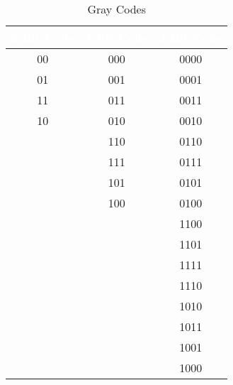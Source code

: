 \begin{table}[H]
  \sffamily
  \newcommand{\head}[1]{\textcolor{white}{\textbf{#1}}}    
  \begin{center}
    \begin{tabular}{ c c c } 
      \hline
      \rowcolor{black!75}
      {\head{2-Bit Code}} & {\head{3-Bit Code}} & \head{4-Bit Code} \\ 
      \hline    
      00  & 000 & 0000 \\     
      01  & 001 & 0001 \\     
      11  & 011 & 0011 \\     
      10  & 010 & 0010 \\     
      & 110 & 0110 \\     
      & 111 & 0111 \\     
      & 101 & 0101 \\     
      & 100 & 0100 \\     
      &     & 1100 \\     
      &     & 1101 \\     
      &     & 1111 \\     
      &     & 1110 \\     
      &     & 1010 \\     
      &     & 1011 \\     
      &     & 1001 \\     
      &     & 1000 \\     
      \hline  
    \end{tabular}
  \end{center}
  \caption{Gray Codes}
  \label{MO:tab:gray_codes}
\end{table}

